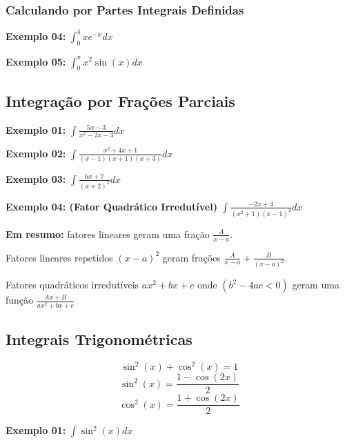 \documentclass[oneside,a4paper,12pt]{article}
\begin{document}
\vspace{400pt}

\subsubsection{Calculando por Partes Integrais Definidas}
{\bf Exemplo 04:} $\int_{0}^{4}xe^{-x}dx$

\vspace{400pt}

{\bf Exemplo 05:} $\int_{0}^{\pi}x^2 \sin(x)dx$

\vspace{320pt}

\subsection{Integração por Frações Parciais}
{\bf Exemplo 01:} $\int \frac{5x-3}{x^2 - 2x -3}dx$

\vspace{400pt}

{\bf Exemplo 02:} $\int \frac{x^2 + 4x + 1}{(x-1)(x+1)(x+3)}dx$

\vspace{330pt}

{\bf Exemplo 03:} $\int \frac{6x + 7}{(x+2)^2}dx$

\vspace{400pt}

{\bf Exemplo 04: (Fator Quadrático Irredutível)} $\int \frac{-2x + 4}{(x^2 + 1)(x-1)^2}dx$

\newpage

{\bf Em resumo:} fatores lineares geram uma fração $\frac{A}{x-a}$.

Fatores lineares repetidos $(x-a)^2$ geram frações $\frac{A}{x-a} + \frac{B}{(x-a)^2}$.

Fatores quadráticos irredutíveis $ax^2 + bx + c$ onde $(b^2 -4ac < 0)$ geram uma função $\frac{Ax + B}{ax^2 + bx + c}$


\subsection{Integrais Trigonométricas} 

$$\sin^{2}(x) + \cos^{2}(x) = 1 $$
$$\sin^{2}(x) = \frac{1 - \cos(2x)}{2}$$
$$\cos^{2}(x) = \frac{1 + \cos(2x)}{2}$$

{\bf Exemplo 01:} $\int \sin^{2}(x)dx$

\vspace{250pt}
\end{document}
